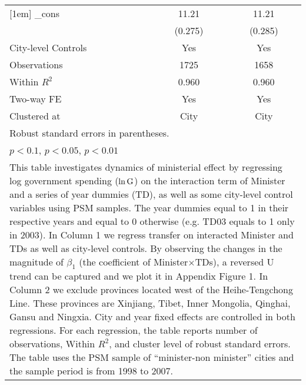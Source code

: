 \documentclass[11pt,a4paper]{article}
\begin{document}
\begin{center}
\begin{scriptsize}
{\begin{tabular}{l*{2}{c}}
[1em]
\_cons      &       11.21\sym{***}&        11.21\sym{***}\\
            &     (0.275)             &     (0.285)         \\
City-level Controls &      Yes        &     Yes    \\
\hline
Observations        &        1725         &        1658         \\
Within $R^{2}$        &       0.960           &       0.960         \\
Two-way FE    &  Yes                   &      Yes \\
Clustered at   &        City         &        City         \\
\hline\hline
\multicolumn{3}{l}{\footnotesize Robust standard errors in parentheses.}\\
\multicolumn{3}{l}{\footnotesize \sym{*} \(p<0.1\), \sym{**} \(p<0.05\), \sym{***} \(p<0.01\)}\\
\multicolumn{3}{p{6.4cm}}{\footnotesize This table investigates dynamics of ministerial effect by regressing log government spending (\(\rm \ln{G}  \)) on the interaction term of Minister and a series of year dummies (TD), as well as some city-level control variables using PSM samples. The year dummies equal to 1 in their respective years and equal to 0 otherwise (e.g. TD03 equals to 1 only in 2003). In Column 1 we regress transfer on interacted Minister and TDs as well as city-level controls. By observing the changes in the magnitude of $\beta_{1}$ (the coefficient of Minister\(\times\)TDs), a reversed U trend can be captured and we plot it in Appendix Figure 1. In Column 2 we exclude provinces located west of the Heihe-Tengchong Line. These provinces are Xinjiang, Tibet, Inner Mongolia, Qinghai, Gansu and Ningxia. City and year fixed effects are controlled in both regressions. For each regression, the table reports number of observations, Within $R^{2}$, and cluster level of robust standard errors. The table uses the PSM sample of ``minister-non minister'' cities and the sample period is from 1998 to 2007. }\\
\end{tabular}
}
\end{scriptsize}
\end{center}
\end{document}
